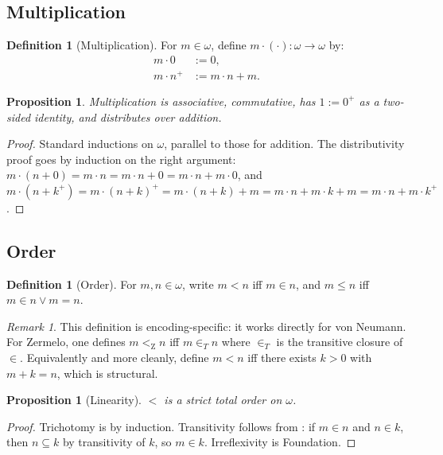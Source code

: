 \documentclass[12pt]{article}
\newtheorem{proposition}[theorem]{Proposition}
\theoremstyle{definition}
\newtheorem{definition}[theorem]{Definition}
\theoremstyle{remark}
\newtheorem{remark}[theorem]{Remark}
\begin{document}
\subsection{Multiplication}

\begin{definition}[Multiplication]\label{def:mult}
For $m \in \omega$, define $m \cdot (\cdot): \omega \to \omega$ by:
\begin{align}
m \cdot 0 &:= 0, \\
m \cdot n^+ &:= m \cdot n + m.
\end{align}
\end{definition}

\begin{proposition}\label{prop:mult-props}
Multiplication is associative, commutative, has $1 := 0^+$ as a two-sided
identity, and distributes over addition.
\end{proposition}

\begin{proof}
Standard inductions on $\omega$, parallel to those for addition. The
distributivity proof goes by induction on the right argument:
$m \cdot (n + 0) = m \cdot n = m \cdot n + 0 = m \cdot n + m \cdot 0$,
and $m \cdot (n + k^+) = m \cdot (n + k)^+ = m \cdot (n+k) + m =
m \cdot n + m \cdot k + m = m \cdot n + m \cdot k^+$.
\end{proof}

\subsection{Order}

\begin{definition}[Order]\label{def:order}
For $m, n \in \omega$, write $m < n$ iff $m \in n$, and $m \leq n$ iff
$m \in n \vee m = n$.
\end{definition}

\begin{remark}
This definition is encoding-specific: it works directly for von Neumann.
For Zermelo, one defines $m <_{\mathrm{Z}} n$ iff $m \in_T n$ where $\in_T$ is
the transitive closure of $\in$. Equivalently and more cleanly, define
$m < n$ iff there exists $k > 0$ with $m + k = n$, which is structural.
\end{remark}

\begin{proposition}[Linearity]
$<$ is a strict total order on $\omega$.
\end{proposition}

\begin{proof}
Trichotomy is by induction. Transitivity follows from :
if $m \in n$ and $n \in k$, then $n \subseteq k$ by transitivity of $k$, so
$m \in k$. Irreflexivity is Foundation.
\end{proof}
\end{document}
